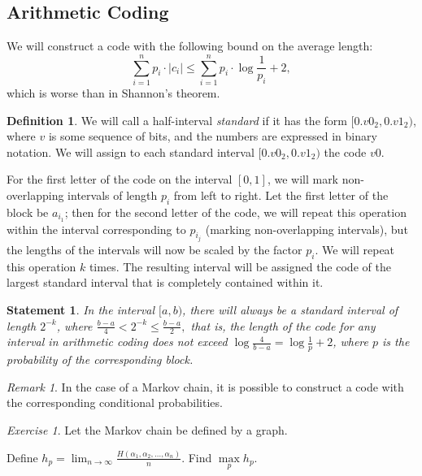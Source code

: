 \documentclass[12pt,sans]{article}
\newcommand{\seqn}[2]{{#1}_1,{#1}_2,\dotsc,{#1}_{#2}}
\theoremstyle{definition}
\newtheorem{definition}{Definition}[section]
\theoremstyle{plain}
\newtheorem{statement}{Statement}[section]
\theoremstyle{remark}
\newtheorem{exercise}{Exercise}[section]
\newtheorem{remark}{Remark}[section]
\begin{document}
\subsection{Arithmetic Coding}
We will construct a code with the following bound on the average length:
\[
\sum_{i=1}^n p_i \cdot |c_i| \le \sum_{i=1}^n p_i \cdot \log \frac{1}{p_i} + 2,
\]
which is worse than in Shannon's theorem.

\begin{definition}
    We will call a half-interval \emph{standard} if it has the form
    \([0.v0_2, 0.v1_2)\), where \(v\) is some sequence of bits,
    and the numbers are expressed in binary notation. We will assign to each
    standard interval \([0.v0_2, 0.v1_2)\) the code \(v0\).

    For the first letter of the code on the interval \([0,1]\), we will mark non-overlapping intervals of length
    \(p_i\) from left to right. Let the first letter of the block be \(a_{i_1}\); then for the second letter of the code, we will repeat this operation within the interval corresponding to \(p_{i_j}\) (marking non-overlapping intervals), but the lengths of the intervals will now be scaled by the factor
    \(p_i\). We will repeat this operation \(k\) times. The resulting interval will be assigned the code of the largest standard interval that is completely contained within it.
\end{definition}

\begin{statement}
    In the interval \([a,b)\), there will always be a standard interval of length \(2^{-k}\), where
    \(
    \frac{b-a}{4} < 2^{-k} \le \frac{b-a}{2},
    \)
    that is, the length of the code for any interval in arithmetic coding does not exceed \(\log \frac{4}{b-a} = \log \frac{1}{p} + 2\), where \(p\) is the probability of the corresponding block.
\end{statement}

\begin{remark}
    In the case of a Markov chain, it is possible to construct a code with the corresponding conditional probabilities.
\end{remark}

\begin{exercise}
    Let the Markov chain be defined by a graph.
    \begin{center}
    \end{center}
    Define
    \(
    h_p = \lim_{n\to\infty} \frac{H(\seqn{\alpha}{n})}{n}.
    \)
    Find \(\max\limits_p h_p\).
\end{exercise}
\end{document}
